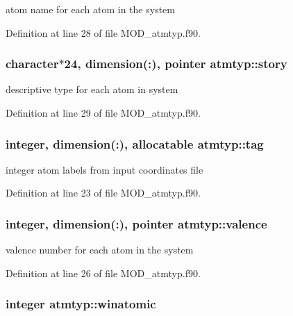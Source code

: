 atom name for each atom in the system 



Definition at line 28 of file M\-O\-D\-\_\-atmtyp.\-f90.

\hypertarget{classatmtyp_a434fbc7be4831519b37b23ddf471109c}{
\subsubsection[{story}]{\setlength{\rightskip}{0pt plus 5cm}character$\ast$24, dimension(\-:), pointer atmtyp\-::story}}\label{classatmtyp_a434fbc7be4831519b37b23ddf471109c}


descriptive type for each atom in system 



Definition at line 29 of file M\-O\-D\-\_\-atmtyp.\-f90.

\hypertarget{classatmtyp_adbff91a8e5a0a2bc4b5d9980f544afdc}{
\subsubsection[{tag}]{\setlength{\rightskip}{0pt plus 5cm}integer, dimension(\-:), allocatable atmtyp\-::tag}}\label{classatmtyp_adbff91a8e5a0a2bc4b5d9980f544afdc}


integer atom labels from input coordinates file 



Definition at line 23 of file M\-O\-D\-\_\-atmtyp.\-f90.

\hypertarget{classatmtyp_a0f05822b2b1986c78f298a45593bf90e}{
\subsubsection[{valence}]{\setlength{\rightskip}{0pt plus 5cm}integer, dimension(\-:), pointer atmtyp\-::valence}}\label{classatmtyp_a0f05822b2b1986c78f298a45593bf90e}


valence number for each atom in the system 



Definition at line 26 of file M\-O\-D\-\_\-atmtyp.\-f90.

\hypertarget{classatmtyp_a7fcd28189bb1b16fced8d4265d22296e}{
\subsubsection[{winatomic}]{\setlength{\rightskip}{0pt plus 5cm}integer atmtyp\-::winatomic}}\label{classatmtyp_a7fcd28189bb1b16fced8d4265d22296e}


